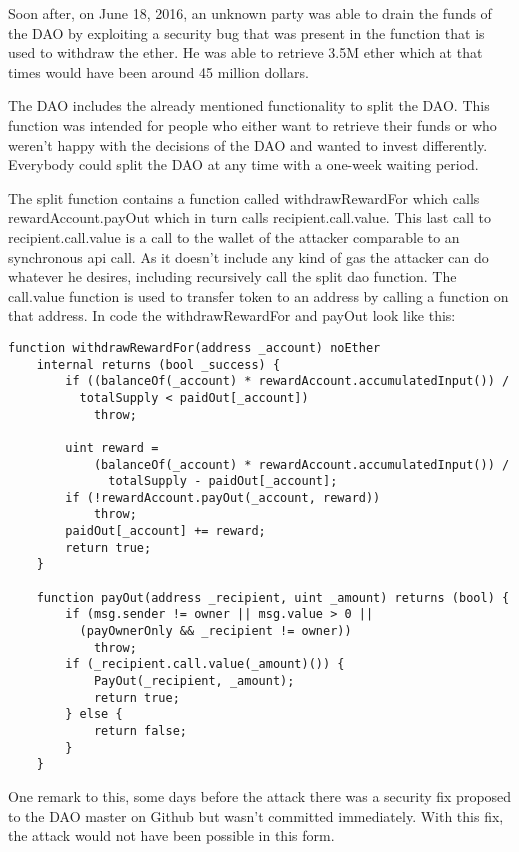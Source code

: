 \documentclass[a4paper, 11pt]{scrartcl}
\begin{document}
Soon after, on June 18, 2016, an unknown party was able to drain the funds of the DAO by exploiting a security bug that was present in the function that is used to withdraw the ether.
He was able to retrieve 3.5M ether which at that times would have been around 45 million dollars.

The DAO includes the already mentioned functionality to split the DAO.
This function was intended for people who either want to retrieve their funds or who weren't happy with the decisions of the DAO and wanted to invest differently.
Everybody could split the DAO at any time with a one-week waiting period.

The split function contains a function called withdrawRewardFor which calls rewardAccount.payOut which in turn calls \textunderscore recipient.call.value. This last call to recipient.call.value is a call to the wallet of the attacker comparable to an synchronous api call. As it doesn't include any kind of gas the attacker can do whatever he desires, including recursively call the split dao function. The call.value function is used to transfer token to an address by calling a function on that address. In code the withdrawRewardFor and payOut look like this: \cite{deconstructingDaoAttack}

\begin{lstlisting}[language=Solidity]
  function withdrawRewardFor(address _account) noEther 
    internal returns (bool _success) {
        if ((balanceOf(_account) * rewardAccount.accumulatedInput()) /
          totalSupply < paidOut[_account])
            throw;

        uint reward =
            (balanceOf(_account) * rewardAccount.accumulatedInput()) /
              totalSupply - paidOut[_account];
        if (!rewardAccount.payOut(_account, reward))
            throw;
        paidOut[_account] += reward;
        return true;
    }

    function payOut(address _recipient, uint _amount) returns (bool) {
        if (msg.sender != owner || msg.value > 0 ||
          (payOwnerOnly && _recipient != owner))
            throw;
        if (_recipient.call.value(_amount)()) {
            PayOut(_recipient, _amount);
            return true;
        } else {
            return false;
        }
    }
\end{lstlisting}

One remark to this, some days before the attack there was a security fix proposed to the DAO master on Github but wasn't committed immediately. With this fix, the attack would not have been possible in this form. \cite{securityFixPayout}
\end{document}
